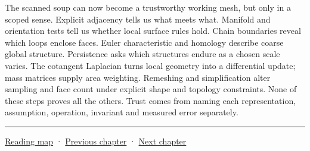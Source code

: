 The scanned soup can now become a trustworthy working mesh, but only in a scoped sense. Explicit adjacency tells us what meets what. Manifold and orientation tests tell us whether local surface rules hold. Chain boundaries reveal which loops enclose faces. Euler characteristic and homology describe coarse global structure. Persistence asks which structures endure as a chosen scale varies. The cotangent Laplacian turns local geometry into a differential update; mass matrices supply area weighting. Remeshing and simplification alter sampling and face count under explicit shape and topology constraints. None of these steps proves all the others. Trust comes from naming each representation, assumption, operation, invariant and measured error separately.

\begin{center}\rule{0.5\linewidth}{0.5pt}\end{center}

\hyperref[volume-reading-map]{Reading map} · \hyperref[03-visual-computing-i-ch001-from-worlds-to-images-and-inference]{Previous chapter} · \hyperref[03-visual-computing-i-ch003-lens-optics-and-image-formation]{Next chapter}
